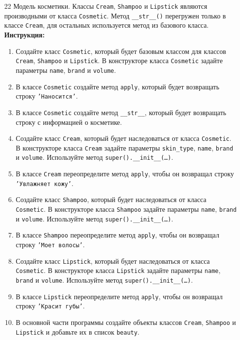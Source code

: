 \begin{enumerate}
\begin{enumerate}
\end{enumerate}
\item[22]
Модель косметики. Классы \texttt{Cream}, \texttt{Shampoo} и \texttt{Lipstick} являются производными от класса \texttt{Cosmetic}. Метод \texttt{\_\_str\_\_()} перегружен только в классе \texttt{Cream}, для остальных используется метод из базового класса.
\textbf{Инструкция:}
\begin{enumerate}
    \item Создайте класс \texttt{Cosmetic}, который будет базовым классом для классов \texttt{Cream}, \texttt{Shampoo} и \texttt{Lipstick}. В конструкторе класса \texttt{Cosmetic} задайте параметры \texttt{name}, \texttt{brand} и \texttt{volume}.
    \item В классе \texttt{Cosmetic} создайте метод \texttt{apply}, который будет возвращать строку \texttt{'Наносится'}.
    \item В классе \texttt{Cosmetic} создайте метод \texttt{\_\_str\_\_}, который будет возвращать строку с информацией о косметике.
    \item Создайте класс \texttt{Cream}, который будет наследоваться от класса \texttt{Cosmetic}. В конструкторе класса \texttt{Cream} задайте параметры \texttt{skin\_type}, \texttt{name}, \texttt{brand} и \texttt{volume}. Используйте метод \texttt{super().\_\_init\_\_(\ldots)}.
    \item В классе \texttt{Cream} переопределите метод \texttt{apply}, чтобы он возвращал строку \texttt{'Увлажняет кожу'}.
    \item Создайте класс \texttt{Shampoo}, который будет наследоваться от класса \texttt{Cosmetic}. В конструкторе класса \texttt{Shampoo} задайте параметры \texttt{name}, \texttt{brand} и \texttt{volume}. Используйте метод \texttt{super().\_\_init\_\_(\ldots)}.
    \item В классе \texttt{Shampoo} переопределите метод \texttt{apply}, чтобы он возвращал строку \texttt{'Моет волосы'}.
    \item Создайте класс \texttt{Lipstick}, который будет наследоваться от класса \texttt{Cosmetic}. В конструкторе класса \texttt{Lipstick} задайте параметры \texttt{name}, \texttt{brand} и \texttt{volume}. Используйте метод \texttt{super().\_\_init\_\_(\ldots)}.
    \item В классе \texttt{Lipstick} переопределите метод \texttt{apply}, чтобы он возвращал строку \texttt{'Красит губы'}.
    \item В основной части программы создайте объекты классов \texttt{Cream}, \texttt{Shampoo} и \texttt{Lipstick} и добавьте их в список \texttt{beauty}.

\end{enumerate}
\end{enumerate}

